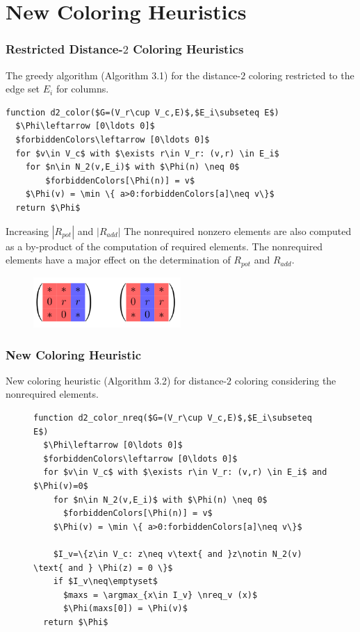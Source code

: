 \documentclass{beamer}
\DeclareMathOperator*{\argmax}{arg\,max}
\newcommand{\nreq}{L}
\begin{document}
\section{New Coloring Heuristics}


\begin{frame}[fragile]
\frametitle{Restricted Distance-$2$ Coloring Heuristics}
{\color{green} The greedy algorithm (Algorithm 3.1)} for
the distance-$2$ coloring restricted to the edge set $E_i$
for columns.
\begin{lstlisting}[mathescape]
function d2_color($G=(V_r\cup V_c,E)$,$E_i\subseteq E$)
  $\Phi\leftarrow [0\ldots 0]$
  $forbiddenColors\leftarrow [0\ldots 0]$
  for $v\in V_c$ with $\exists r\in V_r: (v,r) \in E_i$
    for $n\in N_2(v,E_i)$ with $\Phi(n) \neq 0$
        $forbiddenColors[\Phi(n)] = v$
    $\Phi(v) = \min \{ a>0:forbiddenColors[a]\neq v\}$
  return $\Phi$
\end{lstlisting}
\end{frame}

\begin{frame}{Increasing $|R_{pot}|$ and $| R_{add}|$}
The nonrequired nonzero elements are also computed as a by-product of the computation of required elements.
The nonrequired elements have a major effect on the determination of $R_{pot}$ and $R_{add}$.
\begin{figure}
\centering
\includegraphics[width=0.5\textwidth]{increase}
\end{figure}
\end{frame}

\begin{frame}[fragile]
\frametitle{New Coloring Heuristic}
{\color{blue} New coloring heuristic (Algorithm 3.2)} for distance-$2$ coloring
considering the nonrequired elements.
\begin{figure}
\begin{lstlisting}[mathescape]
function d2_color_nreq($G=(V_r\cup V_c,E)$,$E_i\subseteq E$)
  $\Phi\leftarrow [0\ldots 0]$
  $forbiddenColors\leftarrow [0\ldots 0]$
  for $v\in V_c$ with $\exists r\in V_r: (v,r) \in E_i$ and $\Phi(v)=0$
    for $n\in N_2(v,E_i)$ with $\Phi(n) \neq 0$
      $forbiddenColors[\Phi(n)] = v$
    $\Phi(v) = \min \{ a>0:forbiddenColors[a]\neq v\}$

    $I_v=\{z\in V_c: z\neq v\text{ and }z\notin N_2(v) \text{ and } \Phi(z) = 0 \}$
    if $I_v\neq\emptyset$
      $maxs = \argmax_{x\in I_v} \nreq_v (x)$
      $\Phi(maxs[0]) = \Phi(v)$
  return $\Phi$
\end{lstlisting}
\end{figure}
\end{frame}
\end{document}
